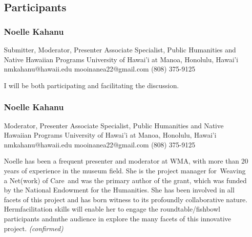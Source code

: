 \documentclass{report}
\begin{document}
            \subsection*{Participants}
              \subsubsection*{ Noelle  Kahanu }
              Submitter, Moderator, Presenter\newline
              Associate Specialist, Public Humanities and Native Hawaiian Programs\newline
              University of Hawai'i at Manoa, Honolulu, Hawai'i
              \newline
              nmkahanu@hawaii.edu\newline
              mooinanea22@gmail.com\newline
              (808) 375-9125\newline

              I will be both participating and facilitating the discussion.\newline


              
                \subsubsection*{ Noelle  Kahanu }
                Moderator, Presenter\newline
                Associate Specialist, Public Humanities and Native Hawaiian Programs\newline
                University of Hawai'i at Manoa, Honolulu, Hawai'i
                \newline
                nmkahanu@hawaii.edu\newline
                mooinanea22@gmail.com\newline
                (808) 375-9125\newline

                Noelle has been a frequent presenter and moderator at WMA, with more than 20 years of experience in the museum field. She is the project manager for Weaving a Net(work) of Care and was the primary author of the grant, which was funded by the National Endowment for the Humanities. She has been involved in all facets of this project and has born witness to its profoundly collaborative nature. Hermfacilitation skills will enable her to engage the roundtable/fishbowl participants andmthe audience in explore the many facets of this innovative project.\newline
                \emph{ (confirmed) }
              
\end{document}
